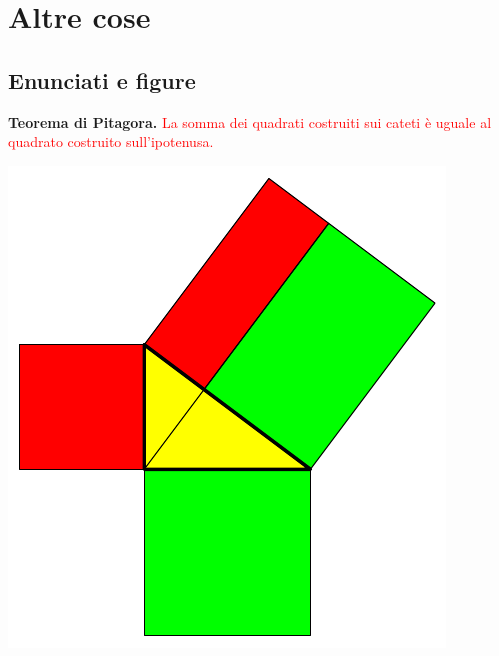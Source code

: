 \documentclass[12pt,italian,oneside]{report}
\newcommand{\rosso}[1]{\textcolor{red}{#1}}
\begin{document}

\chapter{Altre cose}


\section{Enunciati e figure}

\begin{firstheadlineitemize}

\item[] \textbf{Teorema di Pitagora.}
\rosso{La somma dei quadrati costruiti sui cateti \`{e} uguale al quadrato costruito sull'ipotenusa.}

\end{firstheadlineitemize}


\pause

\begin{center}
\includegraphics[scale=1.5]{pitagora3}
\end{center}

\end{document}
